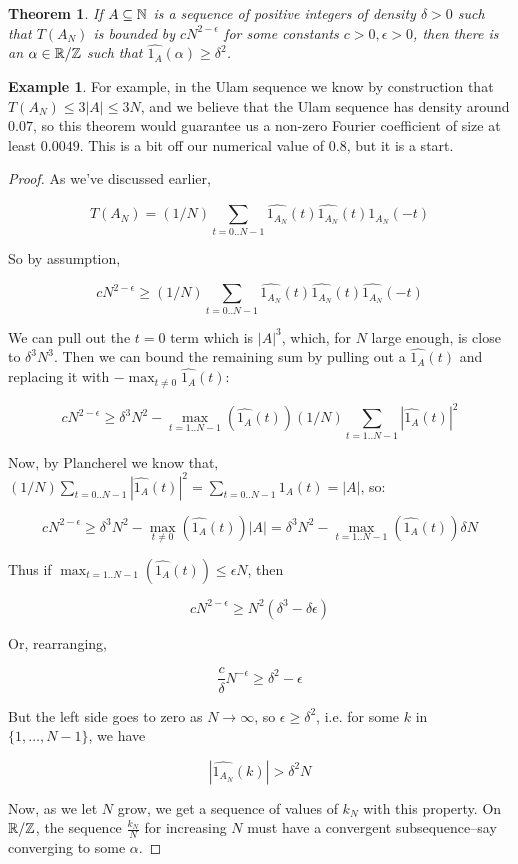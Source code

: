 \documentclass{article}
\newtheorem{theorem}{Theorem}[section]
\theoremstyle{definition}
\newtheorem{example}{Example}
\theoremstyle{remark}
\numberwithin{equation}{section}
\begin{document}
\begin{theorem}\label{thm:alpha}
  If $A \subseteq \mathbb{N}$ is a sequence of positive integers of density
  $\delta > 0$ such that $T(A_N)$ is bounded by $c N^{2-\epsilon}$ for
  some constants $c > 0, \epsilon > 0$, then there is an
  $\alpha \in \mathbb{R}/\mathbb{Z}$ such that $\widehat{1_A}(\alpha) \geq \delta^2$.
\end{theorem}

\begin{example}
  For example, in the Ulam sequence we know by construction that
  $T(A_N) \leq 3|A| \leq 3N$, and we believe that the Ulam sequence
  has density around $0.07$, so this theorem would guarantee us a
  non-zero Fourier coefficient of size at least $0.0049$.  This is a
  bit off our numerical value of $0.8$, but it is a start.
\end{example}

\begin{proof}
  As we've discussed earlier,

\[T(A_N) = (1/N) \sum_{t=0..N-1} \widehat{1_{A_N}}(t) \widehat{1_{A_N}}(t) \widehat{1_{A_N}}(-t)\]

So by assumption, 

\[cN^{2-\epsilon} \geq (1/N) \sum_{t=0..N-1} \widehat{1_{A_N}}(t) \widehat{1_{A_N}}(t) \widehat{1_{A_N}}(-t)\]

We can pull out the $t = 0$ term which is $|A|^3$, which, for $N$
large enough, is close to $\delta^3 N^3$.  Then we can bound the
remaining sum by pulling out a $\widehat{1_A}(t)$ and replacing it
with $-\max_{t\neq 0} \widehat{1_A}(t)$:

\[cN^{2-\epsilon} \geq \delta^3 N^2 - \max_{t=1..N-1}(\widehat{1_A}(t)) (1/N) \sum_{t=1..N-1} |\widehat{1_A}(t)|^2\]

Now, by Plancherel we know that,
$(1/N) \sum_{t=0..N-1} |\widehat{1_A}(t)|^2 = \sum_{t=0..N-1} 1_A(t) =
|A|$, so:

\[cN^{2-\epsilon} \geq \delta^3 N^2 - \max_{t\neq 0}(\widehat{1_A}(t))
|A| = \delta^3 N^2 - \max_{t=1..N-1}(\widehat{1_A}(t)) \delta N\]

Thus if $\max_{t=1..N-1}(\widehat{1_A}(t)) \leq \epsilon N$, then 

\[cN^{2-\epsilon} \geq N^2 (\delta^3 - \delta\epsilon)\]

Or, rearranging, 

\[\frac{c}{\delta} N^{-\epsilon} \geq \delta^2 - \epsilon\]

But the left side goes to zero as $N \to \infty$, so
$\epsilon \geq \delta^2$, i.e. for some $k$ in $\{1, \ldots, N-1\}$,
we have

\[|\widehat{1_{A_N}}(k)| > \delta^2 N\]

Now, as we let $N$ grow, we get a sequence of values of $k_N$ with
this property.  On $\mathbb{R}/\mathbb{Z}$, the sequence $\frac{k_N}{N}$ for
increasing $N$ must have a convergent subsequence--say converging to
some $\alpha$.  \end{proof}
\end{document}
